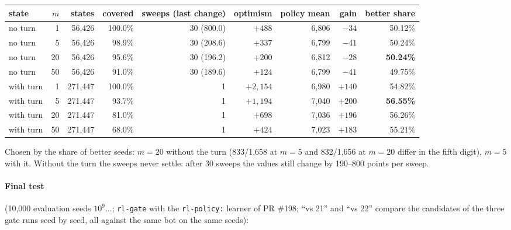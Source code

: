 \documentclass{../polyexp}
\begin{document}
\begin{center}\small
\begin{tabular}{lrrrrrrrr}
\toprule
state & $m$ & states & covered & sweeps (last change) & optimism & policy mean & gain & better share \\
\midrule
no turn   & 1  & 56{,}426  & 100.0\% & 30 (800.0) & $+488$   & 6{,}806 & $-34$  & 50.12\% \\
no turn   & 5  & 56{,}426  & 98.9\%  & 30 (208.6) & $+337$   & 6{,}799 & $-41$  & 50.24\% \\
no turn   & 20 & 56{,}426  & 95.6\%  & 30 (196.2) & $+200$   & 6{,}812 & $-28$  & \textbf{50.24\%} \\
no turn   & 50 & 56{,}426  & 91.0\%  & 30 (189.6) & $+124$   & 6{,}799 & $-41$  & 49.75\% \\
with turn & 1  & 271{,}447 & 100.0\% & 1          & $+2{,}154$ & 6{,}980 & $+140$ & 54.82\% \\
with turn & 5  & 271{,}447 & 93.7\%  & 1          & $+1{,}194$ & 7{,}040 & $+200$ & \textbf{56.55\%} \\
with turn & 20 & 271{,}447 & 81.0\%  & 1          & $+698$   & 7{,}036 & $+196$ & 56.26\% \\
with turn & 50 & 271{,}447 & 68.0\%  & 1          & $+424$   & 7{,}023 & $+183$ & 55.21\% \\
\bottomrule
\end{tabular}
\end{center}
Chosen by the share of better seeds: $m = 20$ without the turn (833/1{,}658 at $m=5$ and 832/1{,}656 at $m=20$
differ in the fifth digit), $m = 5$ with it. Without the turn the sweeps never settle: after 30 sweeps the values
still change by 190--800 points per sweep.

\paragraph{Final test} (10{,}000 evaluation seeds $10^9\dots$; \texttt{rl-gate} with the \texttt{rl-policy:} learner of
PR \#198; ``vs 21'' and ``vs 22'' compare the candidates of the three gate runs seed by seed, all against the same bot
on the same seeds):
\end{document}
